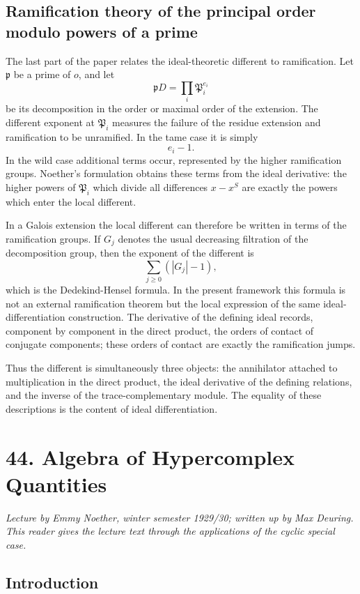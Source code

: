 \documentclass[12pt]{article}
\begin{document}
\subsection{Ramification theory of the principal order modulo powers of a prime}

The last part of the paper relates the ideal-theoretic different to ramification. Let \(\mathfrak p\) be a prime of \(o\), and let
\[
  \mathfrak pD=\prod_i \mathfrak P_i^{e_i}
\]
be its decomposition in the order or maximal order of the extension. The different exponent at \(\mathfrak P_i\) measures the failure of the residue extension and ramification to be unramified. In the tame case it is simply
\[
  e_i-1.
\]
In the wild case additional terms occur, represented by the higher ramification groups. Noether's formulation obtains these terms from the ideal derivative: the higher powers of \(\mathfrak P_i\) which divide all differences \(x-x^S\) are exactly the powers which enter the local different.

In a Galois extension the local different can therefore be written in terms of the ramification groups. If \(G_j\) denotes the usual decreasing filtration of the decomposition group, then the exponent of the different is
\[
  \sum_{j\ge0} (|G_j|-1),
\]
which is the Dedekind-Hensel formula. In the present framework this formula is not an external ramification theorem but the local expression of the same ideal-differentiation construction. The derivative of the defining ideal records, component by component in the direct product, the orders of contact of conjugate components; these orders of contact are exactly the ramification jumps.

Thus the different is simultaneously three objects: the annihilator attached to multiplication in the direct product, the ideal derivative of the defining relations, and the inverse of the trace-complementary module. The equality of these descriptions is the content of ideal differentiation.


\clearpage
\section{44. Algebra of Hypercomplex Quantities}

\textit{Lecture by Emmy Noether, winter semester 1929/30; written up by Max Deuring. This reader gives the lecture text through the applications of the cyclic special case.}

\subsection{Introduction}
\end{document}
